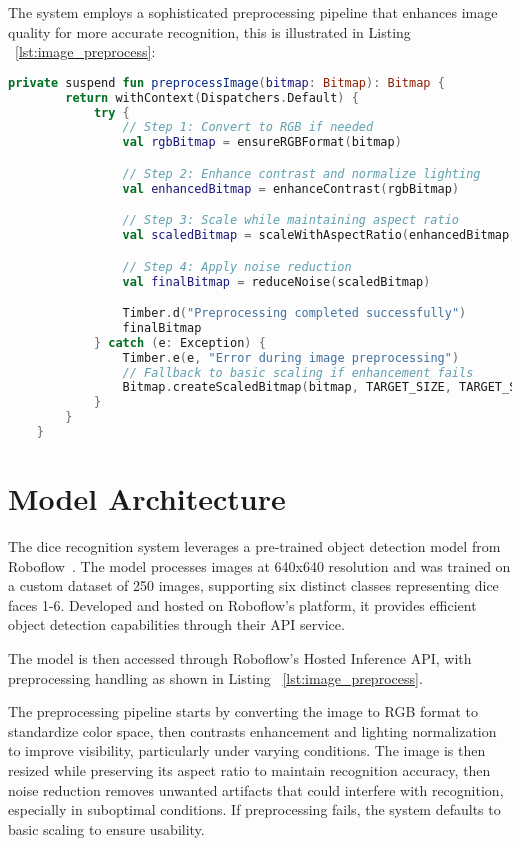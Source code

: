 The system employs a sophisticated preprocessing pipeline that enhances image quality for more accurate recognition, this is illustrated in Listing ~\ref{lst:image_preprocess}:
\begin{lstlisting}[language=Kotlin, caption={Image Preprocessing Pipeline}, label=lst:image_preprocess]
    private suspend fun preprocessImage(bitmap: Bitmap): Bitmap {
        return withContext(Dispatchers.Default) {
            try {
                // Step 1: Convert to RGB if needed
                val rgbBitmap = ensureRGBFormat(bitmap)

                // Step 2: Enhance contrast and normalize lighting
                val enhancedBitmap = enhanceContrast(rgbBitmap)

                // Step 3: Scale while maintaining aspect ratio
                val scaledBitmap = scaleWithAspectRatio(enhancedBitmap, TARGET_SIZE)

                // Step 4: Apply noise reduction
                val finalBitmap = reduceNoise(scaledBitmap)

                Timber.d("Preprocessing completed successfully")
                finalBitmap
            } catch (e: Exception) {
                Timber.e(e, "Error during image preprocessing")
                // Fallback to basic scaling if enhancement fails
                Bitmap.createScaledBitmap(bitmap, TARGET_SIZE, TARGET_SIZE, true)
            }
        }
    }
\end{lstlisting}

\section{Model Architecture}

The dice recognition system leverages a pre-trained object detection model from Roboflow~\cite{bib:kavidataset}. The model processes images at 640x640 resolution and was trained on a custom dataset of 250 images, supporting six distinct classes representing dice faces 1-6. Developed and hosted on Roboflow's platform, it provides efficient object detection capabilities through their API service.

The model is then accessed through Roboflow's Hosted Inference API, with preprocessing handling as shown in Listing ~\ref{lst:image_preprocess}.

The preprocessing pipeline starts by converting the image to RGB format to standardize color space, then contrasts enhancement and lighting normalization to improve visibility, particularly under varying conditions. The image is then resized while preserving its aspect ratio to maintain recognition accuracy, then noise reduction removes unwanted artifacts that could interfere with recognition, especially in suboptimal conditions. If preprocessing fails, the system defaults to basic scaling to ensure usability.

